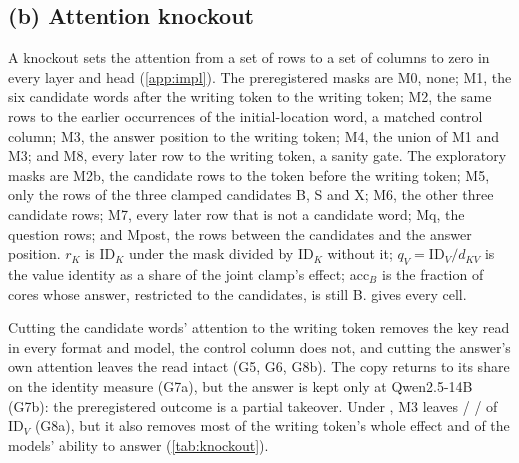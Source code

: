 \subsection{(b) Attention knockout}\label{app:g-knockout}

A knockout sets the attention from a set of rows to a set of columns to zero in every layer and head (\cref{app:impl}). The preregistered masks are M0, none; M1, the six candidate words after the writing token to the writing token; M2, the same rows to the earlier occurrences of the initial-location word, a matched control column; M3, the answer position to the writing token; M4, the union of M1 and M3; and M8, every later row to the writing token, a sanity gate. The exploratory masks are M2b, the candidate rows to the token before the writing token; M5, only the rows of the three clamped candidates B, S and X; M6, the other three candidate rows; M7, every later row that is not a candidate word; Mq, the question rows; and Mpost, the rows between the candidates and the answer position. $r_K$ is $\mathrm{ID}_K$ under the mask divided by $\mathrm{ID}_K$ without it; $q_V = \mathrm{ID}_V/d_{KV}$ is the value identity as a share of the joint clamp's effect; acc$_B$ is the fraction of cores whose answer, restricted to the candidates, is still B.  gives every cell.

\begin{table}[!ht]
\centering
\small
\caption{\textbf{Attention knockout} (preregistration G, part (b); masks in the text). $r_K$: $\mathrm{ID}_K$ under the mask relative to no mask; $q_V$: $\mathrm{ID}_V$ as a share of the joint clamp's effect $d_{KV}$; acc$_B$: fraction of cores whose candidate-restricted answer is B. $n = 150$ cores per cell. M1, M2, M3, M4 and M8 enter G5--G8 and Gate b; the other masks, and every mask under \fmtPost{}, are exploratory. Under \fmtNone{} only the masks that do not need candidate rows are defined.}
\label{tab:knockout}

\end{table}

Cutting the candidate words' attention to the writing token removes the key read in every format and model, the control column does not, and cutting the answer's own attention leaves the read intact (G5, G6, G8b). The copy returns to its \fmtNone{} share on the identity measure (G7a), but the answer is kept only at Qwen2.5-14B (G7b): the preregistered outcome is a partial takeover. Under \fmtNone{}, M3 leaves \GeightaRatioQwenSeven{} / \GeightaRatioQwenFourteen{} / \GeightaRatioMistralSeven{} of $\mathrm{ID}_V$ (G8a), but it also removes most of the writing token's whole effect and of the models' ability to answer (\cref{tab:knockout}).


